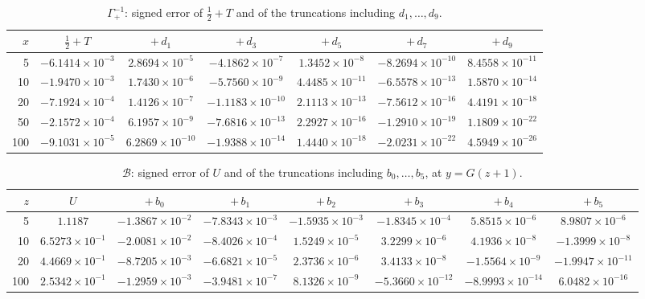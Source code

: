 \documentclass[11pt,a4paper,oneside]{book}
\theoremstyle{plain}
\theoremstyle{definition}
\theoremstyle{remark}
\begin{document}
\begin{table}[htbp]
\centering
\caption{$\Gamma_+^{-1}$: signed error of $\tfrac12+T$ and of the truncations
including $d_1,\dots,d_9$.}
\label{p6:tab:gamma-errors}
\scriptsize
\setlength{\tabcolsep}{3.6pt}
\begin{tabular}{rcccccc}
\toprule
$x$ & $\tfrac12+T$ & $+\,d_1$ & $+\,d_3$ & $+\,d_5$ & $+\,d_7$ & $+\,d_9$\\
\midrule
5 & $-6.1414\!\times\!10^{-3}$ & $2.8694\!\times\!10^{-5}$ & $-4.1862\!\times\!10^{-7}$ & $1.3452\!\times\!10^{-8}$ & $-8.2694\!\times\!10^{-10}$ & $8.4558\!\times\!10^{-11}$\\
10 & $-1.9470\!\times\!10^{-3}$ & $1.7430\!\times\!10^{-6}$ & $-5.7560\!\times\!10^{-9}$ & $4.4485\!\times\!10^{-11}$ & $-6.5578\!\times\!10^{-13}$ & $1.5870\!\times\!10^{-14}$\\
20 & $-7.1924\!\times\!10^{-4}$ & $1.4126\!\times\!10^{-7}$ & $-1.1183\!\times\!10^{-10}$ & $2.1113\!\times\!10^{-13}$ & $-7.5612\!\times\!10^{-16}$ & $4.4191\!\times\!10^{-18}$\\
50 & $-2.1572\!\times\!10^{-4}$ & $6.1957\!\times\!10^{-9}$ & $-7.6816\!\times\!10^{-13}$ & $2.2927\!\times\!10^{-16}$ & $-1.2910\!\times\!10^{-19}$ & $1.1809\!\times\!10^{-22}$\\
100 & $-9.1031\!\times\!10^{-5}$ & $6.2869\!\times\!10^{-10}$ & $-1.9388\!\times\!10^{-14}$ & $1.4440\!\times\!10^{-18}$ & $-2.0231\!\times\!10^{-22}$ & $4.5949\!\times\!10^{-26}$\\
\bottomrule
\end{tabular}
\end{table}

\begin{table}[htbp]
\centering
\caption{$\mathcal{B}$: signed error of $U$ and of the truncations including
$b_0,\dots,b_5$, at $y=G(z+1)$.}
\label{p6:tab:barnes-errors}
\scriptsize
\setlength{\tabcolsep}{3.0pt}
\begin{tabular}{rccccccc}
\toprule
$z$ & $U$ & $+\,b_0$ & $+\,b_1$ & $+\,b_2$ & $+\,b_3$ & $+\,b_4$ & $+\,b_5$\\
\midrule
5 & $1.1187$ & $-1.3867\!\times\!10^{-2}$ & $-7.8343\!\times\!10^{-3}$ & $-1.5935\!\times\!10^{-3}$ & $-1.8345\!\times\!10^{-4}$ & $5.8515\!\times\!10^{-6}$ & $8.9807\!\times\!10^{-6}$\\
10 & $6.5273\!\times\!10^{-1}$ & $-2.0081\!\times\!10^{-2}$ & $-8.4026\!\times\!10^{-4}$ & $1.5249\!\times\!10^{-5}$ & $3.2299\!\times\!10^{-6}$ & $4.1936\!\times\!10^{-8}$ & $-1.3999\!\times\!10^{-8}$\\
20 & $4.4669\!\times\!10^{-1}$ & $-8.7205\!\times\!10^{-3}$ & $-6.6821\!\times\!10^{-5}$ & $2.3736\!\times\!10^{-6}$ & $3.4133\!\times\!10^{-8}$ & $-1.5564\!\times\!10^{-9}$ & $-1.9947\!\times\!10^{-11}$\\
100 & $2.5342\!\times\!10^{-1}$ & $-1.2959\!\times\!10^{-3}$ & $-3.9481\!\times\!10^{-7}$ & $8.1326\!\times\!10^{-9}$ & $-5.3660\!\times\!10^{-12}$ & $-8.9993\!\times\!10^{-14}$ & $6.0482\!\times\!10^{-16}$\\
\bottomrule
\end{tabular}
\end{table}
\end{document}
